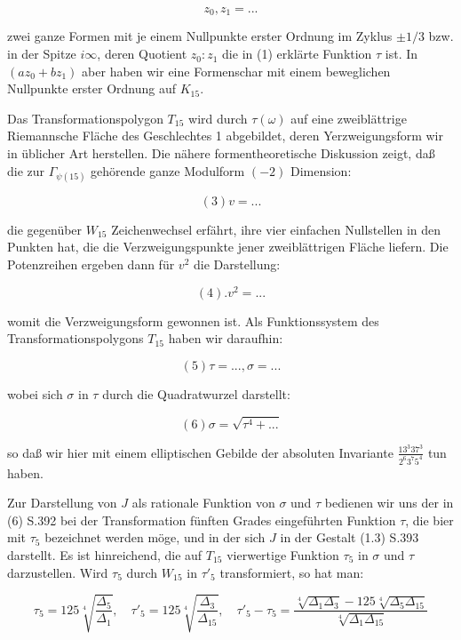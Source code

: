 \documentclass{article}
\begin{document}
$$z_0,z_1=...$$ 

zwei ganze Formen mit je einem Nullpunkte erster Ordnung im Zyklus $\pm1/3$ bzw. in der Spitze $i\infty$, deren Quotient $z_0:z_1$ die in (1) erklärte Funktion $\tau$ ist. In $(az_0+bz_1)$ aber haben wir eine Formenschar mit einem beweglichen Nullpunkte erster Ordnung auf $K_15$. 

Das Transformationspolygon $T_15$ wird durch $\tau(\omega)$ auf eine zweiblättrige Riemannsche Fläche des Geschlechtes 1 abgebildet, deren Yerzweigungsform wir in üblicher Art herstellen. Die nähere formentheoretische Diskussion zeigt, daß die zur $\Gamma_{\psi(15)}$ gehörende ganze Modulform 
$(-2)$ Dimension: 

$$(3) v=...$$

die gegenüber $W_{15}$ Zeichenwechsel erfährt, ihre vier einfachen Nullstellen in den Punkten hat, die die Verzweigungspunkte jener zweiblättrigen Fläche liefern. Die Potenzreihen ergeben dann für $v^2$ die Darstellung: 

$$(4) . v^2=... $$

womit die Verzweigungsform gewonnen ist. Als Funktionssystem des Transformationspolygons $T_{15}$ haben wir daraufhin:

$$(5) \tau=...,\sigma=...$$ 

wobei sich $\sigma$ in $\tau$ durch die Quadratwurzel darstellt: 

$$(6) \sigma=\sqrt{\tau^4+...}$$

so daß wir hier mit einem elliptischen Gebilde der absoluten Invariante $\frac{13^3 37^3}{2^6 3^7 5^4}$ tun haben.






Zur Darstellung von $J$ als rationale Funktion von $\sigma$ und $\tau$ bedienen wir uns der in (6) S.392 bei der Transformation fünften Grades eingeführten Funktion $\tau$, die bier mit $\tau_5$ bezeichnet werden möge, und in der sich $J$ in der Gestalt (1.3) S.393 darstellt. Es ist hinreichend, die auf $T_{15}$ vierwertige Funktion $\tau_5$ in $\sigma$ und $\tau$ darzustellen. Wird $\tau_5$ durch $W_{15}$ in $\tau'_5$ transformiert, so hat man: 

\begin{equation}
  \tau_5=125\sqrt[4]{\frac{\Delta_5}{\Delta_1}},\quad
  \tau'_5=125\sqrt[4]{\frac{\Delta_3}{\Delta_{15}}},\quad
\tau'_5-\tau_5=\frac{\sqrt[4]{\Delta_1\Delta_3}-125\sqrt[4]{\Delta_5\Delta_{15}}}{\sqrt[4]{\Delta_1\Delta_{15}}}
\end{equation}
\end{document}
